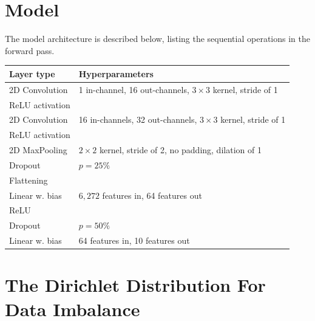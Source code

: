 \documentclass{article}
\begin{document}
\vfill
\pagebreak




\appendix
\section{Model}
\label{app:model}
The model architecture is described below, listing the sequential operations in the forward pass.
\begin{table}[htb!]
    \centering
    \begin{tabular}{l|p{5cm}}
            Layer type & Hyperparameters\\
            \hline
            2D Convolution & 1 in-channel, 16 out-channels, $3\times 3$ kernel, stride of 1\\
            ReLU activation\\
            2D Convolution & 16 in-channels, 32 out-channels, $3\times 3$ kernel, stride of 1\\
            ReLU activation\\
            2D MaxPooling & $2\times 2$ kernel, stride of 2, no padding, dilation of 1\\
            Dropout & $p=25\%$\\
            Flattening\\
            Linear w. bias & $6,272$ features in, 64 features out\\
            ReLU \\
            Dropout & $p=50\%$\\
            Linear w. bias & 64 features in, 10 features out
        \end{tabular}
\end{table}\noindent
\section{The Dirichlet Distribution For Data Imbalance}
\end{document}
